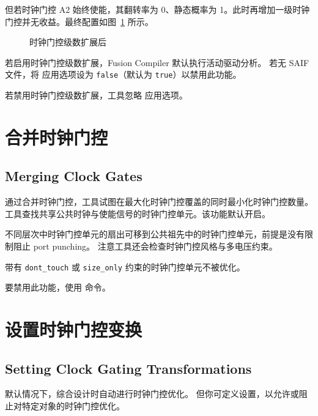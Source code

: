 但若时钟门控 A2 始终使能，其翻转率为 0、静态概率为 1。此时再增加一级时钟门控并无收益。最终配置如图~\ref{fig:cg-after-expand} 所示。

\begin{figure}[htbp]
\centering
{}
\caption{时钟门控级数扩展后}
\label{fig:cg-after-expand}
\end{figure}

若启用时钟门控级数扩展，Fusion Compiler 默认执行活动驱动分析。
若无 SAIF 文件，将  应用选项设为 \texttt{false}（默认为 \texttt{true}）以禁用此功能。

若禁用时钟门控级数扩展，工具忽略  应用选项。

\section{合并时钟门控}
\subsection*{Merging Clock Gates}

通过合并时钟门控，工具试图在最大化时钟门控覆盖的同时最小化时钟门控数量。
工具查找共享公共时钟与使能信号的时钟门控单元。该功能默认开启。

不同层次中时钟门控单元的扇出可移到公共祖先中的时钟门控单元，前提是没有限制阻止 port punching。
注意工具还会检查时钟门控风格与多电压约束。

带有 \texttt{dont\_touch} 或 \texttt{size\_only} 约束的时钟门控单元不被优化。

要禁用此功能，使用  命令。

\section{设置时钟门控变换}
\subsection*{Setting Clock Gating Transformations}

默认情况下，综合设计时自动进行时钟门控优化。
但你可定义设置，以允许或阻止对特定对象的时钟门控优化。

